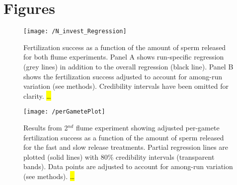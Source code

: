 \documentclass{article}
\begin{document}
\section*{Figures}
 
\begin{figure}[!ht] 
\texttt{[image: /N\_invest\_Regression]}
\caption{Fertilization success as a function of the amount of sperm released for both flume experiments. Panel A shows run-specific regression (grey lines) in addition to the overall regression (black line). Panel B shows the fertilization success adjusted to account for among-run variation (see methods). Credibility intervals have been omitted for clarity. \hl{\ldots}}
\label{fig:fertPlots}
\end{figure}
\newpage{}


\begin{figure}[!ht] 
\texttt{[image: /perGametePlot]}
\caption{Results from 2$^{nd}$ flume experiment showing adjusted per-gamete fertilization success as a function of the amount of sperm released for the fast and slow release treatments. Partial regression lines are plotted (solid lines) with $80\%$ credibility intervals (transparent bands). Data points are adjusted to account for among-run variation (see methods).  \hl{\ldots}}
\label{fig:perGamete}
\end{figure}

\newpage{}






\end{document}
